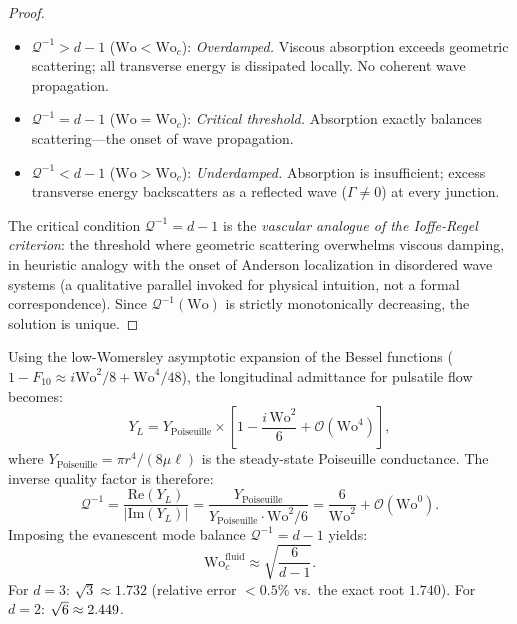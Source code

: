 \begin{proof}
\begin{itemize}
\item
$\mathcal{Q}^{-1} > d-1$ ($\mathrm{Wo} < \mathrm{Wo}_c$): \emph{Overdamped.}
Viscous absorption exceeds geometric scattering; all transverse energy is
dissipated locally. No coherent wave propagation.
\item
$\mathcal{Q}^{-1} = d-1$ ($\mathrm{Wo} = \mathrm{Wo}_c$): \emph{Critical
threshold.} Absorption exactly balances scattering---the onset of wave
propagation.
\item
$\mathcal{Q}^{-1} < d-1$ ($\mathrm{Wo} > \mathrm{Wo}_c$): \emph{Underdamped.}
Absorption is insufficient; excess transverse energy backscatters as a reflected
wave ($\Gamma \neq 0$) at every junction.
\end{itemize}

The critical condition $\mathcal{Q}^{-1} = d-1$ is the \emph{vascular analogue
of the Ioffe-Regel criterion}: the threshold where geometric scattering
overwhelms viscous damping, in heuristic analogy with the onset of Anderson
localization in disordered wave systems (a qualitative parallel invoked for
physical intuition, not a formal correspondence). Since
$\mathcal{Q}^{-1}(\mathrm{Wo})$ is strictly monotonically decreasing, the
solution is unique. \qedhere
\end{proof}

\begin{corollary}
\label{cor:closed_form_woc}
Using the low-Womersley asymptotic expansion of the Bessel functions ($1 -
F_{10} \approx i\mathrm{Wo}^2/8 + \mathrm{Wo}^4/48$), the longitudinal
admittance for pulsatile flow becomes:
\begin{equation}
Y_L = Y_{\mathrm{Poiseuille}} \times \left[1 - \frac{i\,\mathrm{Wo}^2}{6} +
\mathcal{O}(\mathrm{Wo}^4)\right],
\end{equation}
where $Y_{\mathrm{Poiseuille}} = \pi r^4/(8\mu \ell)$ is the steady-state
Poiseuille conductance. The inverse quality factor is therefore:
\begin{equation}
\mathcal{Q}^{-1} = \frac{\mathrm{Re}(Y_L)}{|\mathrm{Im}(Y_L)|} =
\frac{Y_{\mathrm{Poiseuille}}}{Y_{\mathrm{Poiseuille}} \cdot \mathrm{Wo}^2/6}
= \frac{6}{\mathrm{Wo}^2} + \mathcal{O}(\mathrm{Wo}^{0}).
\end{equation}
Imposing the evanescent mode balance $\mathcal{Q}^{-1} = d-1$ yields:
\begin{equation}
\mathrm{Wo}_c^{\mathrm{fluid}} \approx \sqrt{\frac{6}{d-1}}.
\label{eq:woc_closed_form}
\end{equation}
For $d=3$: $\sqrt{3} \approx 1.732$ (relative error $<0.5\%$ vs.\ the exact root
$1.740$). For $d=2$: $\sqrt{6} \approx 2.449$.
\end{corollary}

